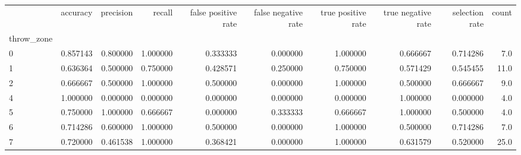\begin{tabular}{lrrrrrrrrr}
\toprule
{} &  accuracy &  precision &    recall &  false positive rate &  false negative rate &  true positive rate &  true negative rate &  selection rate &  count \\
throw\_zone &           &            &           &                      &                      &                     &                     &                 &        \\
\midrule
0          &  0.857143 &   0.800000 &  1.000000 &             0.333333 &             0.000000 &            1.000000 &            0.666667 &        0.714286 &    7.0 \\
1          &  0.636364 &   0.500000 &  0.750000 &             0.428571 &             0.250000 &            0.750000 &            0.571429 &        0.545455 &   11.0 \\
2          &  0.666667 &   0.500000 &  1.000000 &             0.500000 &             0.000000 &            1.000000 &            0.500000 &        0.666667 &    9.0 \\
4          &  1.000000 &   0.000000 &  0.000000 &             0.000000 &             0.000000 &            0.000000 &            1.000000 &        0.000000 &    4.0 \\
5          &  0.750000 &   1.000000 &  0.666667 &             0.000000 &             0.333333 &            0.666667 &            1.000000 &        0.500000 &    4.0 \\
6          &  0.714286 &   0.600000 &  1.000000 &             0.500000 &             0.000000 &            1.000000 &            0.500000 &        0.714286 &    7.0 \\
7          &  0.720000 &   0.461538 &  1.000000 &             0.368421 &             0.000000 &            1.000000 &            0.631579 &        0.520000 &   25.0 \\
\bottomrule
\end{tabular}
